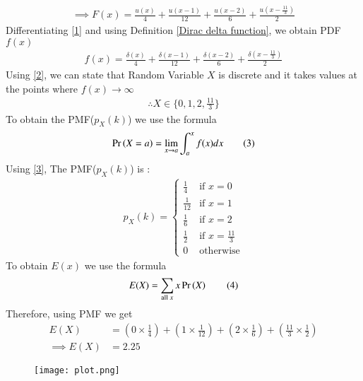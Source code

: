 \documentclass[journal,12pt,twocolumn]{IEEEtran}
\begin{document}
\begin{align*}
\implies F(x)=\frac{u(x)}{4}+\frac{u(x-1)}{12}+\frac{u(x-2)}{6}+\frac{u(x-\frac{11}{3})}{2} \tag{1} \label{1}
\end{align*}
Differentiating \eqref{1} and using Definition \ref{Dirac delta function}, we obtain PDF $f(x)$ 
\begin{align*}
f(x)=\frac{\delta(x)}{4}+\frac{\delta(x-1)}{12}+\frac{\delta(x-2)}{6}+\frac{\delta(x-\frac{11}{3})}{2} \tag{2} \label{2}
\end{align*}
 Using \eqref{2}, we can state that Random Variable $X$ is discrete and it takes values at the points where $f(x) \to \infty$ \\
\begin{align*}
\therefore X \in \{0, 1, 2, \frac{11}{3}\}
\end{align*}
 To obtain the PMF($p_X(k)$) we use the formula
\begin{align*}
\Pr\left(X=a\right) = \lim_{x\to a}\int_{a}^{x}f(x)dx \tag{3} \label{3}
\end{align*}
 Using \eqref{3}, The PMF($p_X(k)$) is :
\begin{align*}
p_X(k)=
\begin{cases}
\frac{1}{4} & \text{if } x=0 \\
\frac{1}{12} & \text{if } x=1 \\
\frac{1}{6} & \text{if } x=2 \\
\frac{1}{2} & \text{if } x=\frac{11}{3} \\
0 & \text{otherwise}
\end{cases}
\end{align*}
 To obtain $E(x)$ we use the formula
\begin{align*}
E(X) = \sum _{\text{all }x} x\Pr\left(X\right) \label{4} \tag{4}
\end{align*}
 Therefore, using PMF we get
\begin{align*}
E(X)& = (0\times \frac{1}{4}) + (1\times \frac{1}{12}) + (2\times \frac{1}{6}) + (\frac{11}{3}\times \frac{1}{2}) \\
\implies E(X) &= 2.25
\end{align*}
\newpage
\begin{figure}[h!]
    \centering
    \texttt{[image: plot.png]}
    \label{fig:1}
\end{figure}
\end{document}
